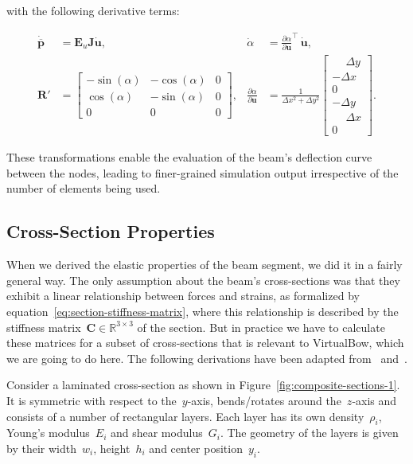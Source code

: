 with the following derivative terms:

\begin{align}
\dot{\overline{\boldsymbol{p}}} &= \boldsymbol{E}_{u}\boldsymbol{J}\dot{\boldsymbol{u}},
&
\dot{\alpha} &= \frac{\partial\alpha}{\partial\boldsymbol{u}}^\intercal\,\dot{\boldsymbol{u}}, \\
\boldsymbol{R}' &= \begin{bmatrix}
-\sin(\alpha) & -\cos(\alpha) & 0 \\
\cos(\alpha) & -\sin(\alpha) & 0 \\
0 & 0 & 0
\end{bmatrix},
&
\frac{\partial\alpha}{\partial\boldsymbol{u}} &=
\frac{1}{\Delta x^2 + \Delta y^2}
\begin{bmatrix}
\phantom{-}\Delta y \\
-\Delta x \\
0 \\
-\Delta y \\
\phantom{-}\Delta x \\
0
\end{bmatrix}.
\end{align}

These transformations enable the evaluation of the beam's deflection curve between the nodes, leading to finer-grained simulation output irrespective of the number of elements being used.

\newpage
\subsection{Cross-Section Properties}

When we derived the elastic properties of the beam segment, we did it in a fairly general way.
The only assumption about the beam's cross-sections was that they exhibit a linear relationship between forces and strains, as formalized by equation~\eqref{eq:section-stiffness-matrix}, where this relationship is described by the stiffness matrix~$\boldsymbol{C} \in \mathbb{R}^{3 \times 3}$ of the section.
But in practice we have to calculate these matrices for a subset of cross-sections that is relevant to VirtualBow, which we are going to do here.
The following derivations have been adapted from~\cite{bib:tm2} and~\cite{bib:wiki-sandwich}.

Consider a laminated cross-section as shown in Figure~\ref{fig:composite-sections-1}.
It is symmetric with respect to the~$y$-axis, bends/rotates around the~$z$-axis and consists of a number of rectangular layers.
Each layer has its own density~$\rho_i$, Young's modulus~$E_i$ and shear modulus~$G_i$.
The geometry of the layers is given by their width~$w_i$, height~$h_i$ and center position~$y_i$.

